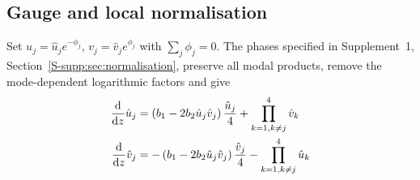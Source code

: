 \documentclass{optica-article}
\numberwithin{equation}{section}
\begin{document}
\subsection{Gauge and local normalisation}\label{subsec:bar-coords}
Set $u_j=\hat u_j e^{-\phi_j}$, $v_j=\hat v_j e^{\phi_j}$ with $\sum_j\phi_j=0$.
The phases specified in Supplement~1, Section~\ref*{S-supp:sec:normalisation}, preserve all modal products, remove the mode-dependent logarithmic factors and give
\begin{align}
\frac{\mathrm{d}}{\mathrm{d}z} \hat{u}_j &= \left(b_1 - 2b_2\hat{u}_j \hat{v}_j \right) \frac{\hat{u}_j}{4} + \prod\limits_{k=1, k \ne j}^{4} \hat{v}_k \notag \\
\frac{\mathrm{d}}{\mathrm{d}z} \hat{v}_j &= -\left(b_1 - 2b_2\hat{u}_j \hat{v}_j\right) \frac{\hat{v}_j}{4} - \prod\limits_{k=1, k \ne j}^{4} \hat{u}_k \label{eq:uv-hat-system}
\end{align}
\end{document}
